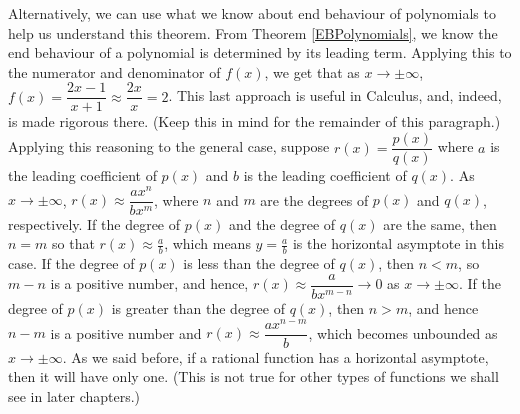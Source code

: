 \smallskip

Alternatively, we can use what we know about end behaviour of polynomials to help us understand this theorem.  From Theorem \ref{EBPolynomials}, we know the end behaviour of a polynomial is determined by its leading term.  Applying this to the numerator and denominator of $f(x)$, we get that as $x \rightarrow \pm \infty$, $f(x) = \dfrac{2x-1}{x+1} \approx \dfrac{2x}{x} = 2$.  This last approach is useful in Calculus, and, indeed, is made rigorous there.  (Keep this in mind for the remainder of this paragraph.)  Applying this reasoning to the general case, suppose $r(x) = \dfrac{p(x)}{q(x)}$ where $a$ is the leading coefficient of $p(x)$ and $b$ is the leading coefficient of $q(x)$. As $x \rightarrow \pm \infty$, $r(x) \approx \dfrac{ax^n}{bx^m}$, where $n$ and $m$ are the degrees of $p(x)$ and $q(x)$, respectively.  If the degree of $p(x)$ and the degree of $q(x)$ are the same, then $n=m$ so that $r(x) \approx \frac{a}{b}$, which means $y=\frac{a}{b}$ is the horizontal asymptote in this case.  If the degree of $p(x)$ is less than the degree of $q(x)$, then $n < m$, so $m-n$ is a positive number, and hence, $r(x) \approx \dfrac{a}{bx^{m-n}} \rightarrow 0$ as $x \rightarrow \pm \infty$.  If the degree of $p(x)$ is greater than the degree of $q(x)$, then $n > m$, and hence $n-m$ is a positive number and $r(x) \approx \dfrac{ax^{n-m}}{ b}$, which becomes unbounded as $x \rightarrow \pm \infty$.  As we said before, if a rational function has a horizontal asymptote, then it will have only one.  (This is not true for other types of functions we shall see in later chapters.)
 
\medskip

